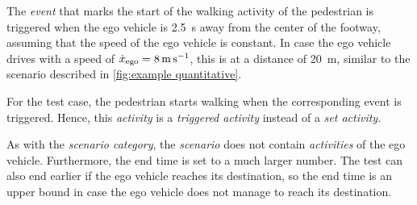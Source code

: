 The \textit{event} that marks the start of the walking activity of the pedestrian is triggered when the ego vehicle is \SI{2.5}{\second} away from the center of the footway, assuming that the speed of the ego vehicle is constant. In case the ego vehicle drives with a speed of $\dot{x}_{\mathrm{ego}}=\SI{8}{\meter\per\second}$, this is at a distance of \SI{20}{\meter}, similar to the scenario described in \cref{fig:example quantitative}.

For the test case, the pedestrian starts walking when the corresponding event is triggered. Hence, this \textit{activity} is a \textit{triggered activity} instead of a \textit{set activity}.

As with the \textit{scenario category}, the \textit{scenario} does not contain \textit{activities} of the ego vehicle. Furthermore, the end time is set to a much larger number. The test can also end earlier if the ego vehicle reaches its destination, so the end time is an upper bound in case the ego vehicle does not manage to reach its destination.

